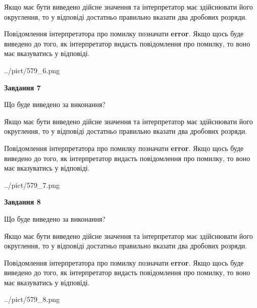 \documentclass[12pt, ukrainian]{article}
\begin{document}
{\begin {Large}
Якщо має бути виведено дійсне значення та інтерпретатор має здійснювати його округлення, 
то у відповіді достатньо правильно вказати два дробових розряди.

Повідомлення інтерпретатора про помилку позначати \textbf{error}.
Якщо щось буде виведено до того, як інтерпретатор видасть повідомлення про помилку, 
то воно має вказуватись у відповіді. \par

\begin{center}
	{../pict/579_6.png}
\end{center}
\newpage

{\begin {center}\textbf{Завдання 7}\end {center}}\par
Що буде виведено за виконання? \par

Якщо має бути виведено дійсне значення та інтерпретатор має здійснювати його округлення, 
то у відповіді достатньо правильно вказати два дробових розряди.

Повідомлення інтерпретатора про помилку позначати \textbf{error}.
Якщо щось буде виведено до того, як інтерпретатор видасть повідомлення про помилку, 
то воно має вказуватись у відповіді. \par

\begin{center}
	{../pict/579_7.png}
\end{center}
\newpage

{\begin {center}\textbf{Завдання 8}\end {center}}\par
Що буде виведено за виконання? \par

Якщо має бути виведено дійсне значення та інтерпретатор має здійснювати його округлення, 
то у відповіді достатньо правильно вказати два дробових розряди.

Повідомлення інтерпретатора про помилку позначати \textbf{error}.
Якщо щось буде виведено до того, як інтерпретатор видасть повідомлення про помилку, 
то воно має вказуватись у відповіді. \par

\begin{center}
	{../pict/579_8.png}
\end{center}
\newpage


\end{Large}}
\end{document}
